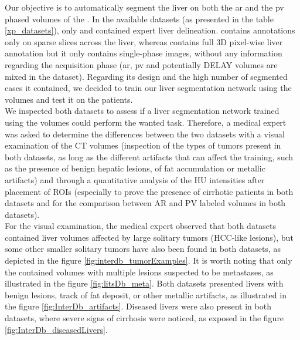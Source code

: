 Our objective is to automatically segment the liver on both the \ac{ar} and the \ac{pv} phased volumes of the \textbf{}. In the available datasets (as presented in the table \ref{xp_datasets}), only \textbf{} and \textbf{} contained expert liver delineation. \textbf{} contains annotations only on sparse slices across the liver, whereas \textbf{} contains full 3D pixel-wise liver annotation but it only contains single-phase images, without any information regarding the
acquisition phase (\ac{ar}, \ac{pv} and potentially DELAY volumes are mixed in the dataset).
Regarding its design and the high number of segmented cases it contained, we decided to train our liver segmentation network using the \textbf{} volumes and test it on the \textbf{} patients.\\
We inspected both datasets to assess if a liver segmentation network trained using the \textbf{} volumes could perform the wanted task. Therefore, a medical expert was asked to determine the differences between the two datasets with a visual examination of the CT volumes (inspection of the types of tumors present in both datasets, as long as the different artifacts that can affect the training, such as the presence of benign hepatic lesions, of fat accumulation or metallic artifacts) and through a quantitative analysis of the HU intensities after placement of ROIs (especially to prove the presence of cirrhotic patients in both datasets and for the comparison between AR and PV labeled volumes in both datasets). \\
For the visual examination, the medical expert observed that both datasets contained liver volumes affected by large solitary tumors (HCC-like lesions), but some other smaller solitary tumors have also been found in both datasets, as depicted in the figure \ref{fig:interdb_tumorExamples}. It is worth noting that only the \textbf{} contained volumes with multiple lesions suspected to be metastases, as illustrated in the figure \ref{fig:litsDb_meta}. Both datasets presented livers with benign lesions, track of fat deposit, or other metallic artifacts, as illustrated in the figure \ref{fig:InterDb_artifacts}. Diseased livers were also present in both datasets, where severe signs of cirrhosis were noticed, as exposed in the figure \ref{fig:InterDb_diseasedLivers}.

